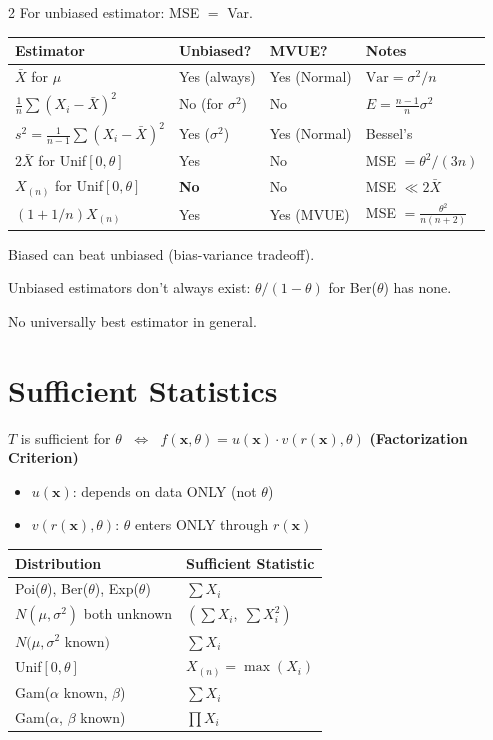 \documentclass[8pt]{extarticle}
\begin{document}
\begin{multicols}{2}
For unbiased estimator: MSE $=$ Var.

\begin{tabular}{@{}llll@{}}
\toprule
\textbf{Estimator} & \textbf{Unbiased?} & \textbf{MVUE?} & \textbf{Notes} \\
\midrule
$\bar X$ for $\mu$ & Yes (always) & Yes (Normal) & $\text{Var} = \sigma^2/n$ \\[2pt]
$\frac{1}{n}\sum(X_i{-}\bar X)^2$ & No (for $\sigma^2$) & No & $E = \frac{n-1}{n}\sigma^2$ \\[2pt]
$s^2 = \frac{1}{n-1}\sum(X_i{-}\bar X)^2$ & Yes ($\sigma^2$) & Yes (Normal) & Bessel's \\[2pt]
$2\bar X$ for Unif$[0,\theta]$ & Yes & No & MSE $= \theta^2/(3n)$ \\[2pt]
$X_{(n)}$ for Unif$[0,\theta]$ & \textbf{No} & No & MSE $\ll 2\bar X$ \\[2pt]
$(1{+}1/n)X_{(n)}$ & Yes & Yes (MVUE) & MSE $= \frac{\theta^2}{n(n+2)}$ \\
\bottomrule
\end{tabular}

\medskip

Biased can beat unbiased (bias-variance tradeoff).

Unbiased estimators don't always exist: $\theta/(1{-}\theta)$ for Ber($\theta$) has none.

No universally best estimator in general.

\section{Sufficient Statistics}

$T$ is sufficient for $\theta$ $\;\Leftrightarrow\;$ $f(\mathbf{x},\theta) = u(\mathbf{x}) \cdot v(r(\mathbf{x}), \theta)$ \quad \textbf{(Factorization Criterion)}

\begin{itemize}
\item $u(\mathbf{x})$: depends on data ONLY (not $\theta$)
\item $v(r(\mathbf{x}),\theta)$: $\theta$ enters ONLY through $r(\mathbf{x})$
\end{itemize}

\begin{tabular}{@{}ll@{}}
\toprule
\textbf{Distribution} & \textbf{Sufficient Statistic} \\
\midrule
Poi($\theta$), Ber($\theta$), Exp($\theta$) & $\sum X_i$ \\
$N(\mu,\sigma^2)$ both unknown & $(\sum X_i, \; \sum X_i^2)$ \\
$N(\mu, \sigma^2$ known$)$ & $\sum X_i$ \\
Unif$[0,\theta]$ & $X_{(n)} = \max(X_i)$ \\
Gam($\alpha$ known, $\beta$) & $\sum X_i$ \\
Gam($\alpha$, $\beta$ known) & $\prod X_i$ \\
\bottomrule
\end{tabular}


\end{multicols}
\end{document}
